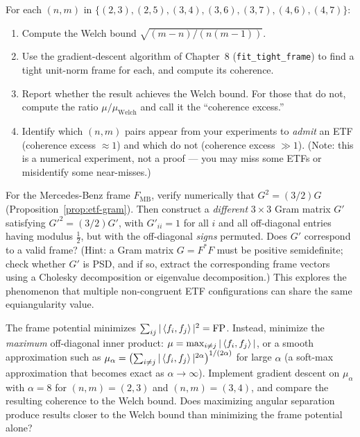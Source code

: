 \begin{exercisebox}[title={Lab Exercise 9.2: Welch Bound Survey}]
For each $(n,m)$ in $\{(2,3),(2,5),(3,4),(3,6),(3,7),(4,6),(4,7)\}$:
\begin{enumerate}[label=(\alph*)]
  \item Compute the Welch bound $\sqrt{(m-n)/(n(m-1))}$.
  \item Use the gradient-descent algorithm of Chapter~8
        (\texttt{fit\_tight\_frame}) to find a tight unit-norm frame for
        each, and compute its coherence.
  \item Report whether the result achieves the Welch bound. For those
        that do not, compute the ratio $\mu/\mu_{\mathrm{Welch}}$ and
        call it the ``coherence excess.''
  \item Identify which $(n,m)$ pairs appear from your experiments to
        \emph{admit} an ETF (coherence excess $\approx 1$) and which do
        not (coherence excess $\gg 1$). (Note: this is a numerical
        experiment, not a proof --- you may miss some ETFs or
        misidentify some near-misses.)
\end{enumerate}
\end{exercisebox}

\begin{exercisebox}[title={Lab Exercise 9.3: The Gram Matrix Condition}]
For the Mercedes-Benz frame $F_\mathrm{MB}$, verify numerically that
$G^2=(3/2)G$ (Proposition~\ref{prop:etf-gram}). Then construct a
\emph{different} $3\times3$ Gram matrix $G'$ satisfying $G'^2=(3/2)G'$,
with $G'_{ii}=1$ for all $i$ and all off-diagonal entries having modulus
$\tfrac12$, but with the off-diagonal \emph{signs} permuted. Does $G'$
correspond to a valid frame? (Hint: a Gram matrix $G=F^*F$ must be
positive semidefinite; check whether $G'$ is PSD, and if so, extract the
corresponding frame vectors using a Cholesky decomposition or eigenvalue
decomposition.) This explores the phenomenon that multiple non-congruent
ETF configurations can share the same equiangularity value.
\end{exercisebox}

\begin{exercisebox}[title={Lab Exercise 9.4: Coherence-Minimizing Descent}]
The frame potential minimizes $\sum_{ij}|\left\langle f_i, f_j \right\rangle|^2=\operatorname{FP}$.
Instead, minimize the \emph{maximum} off-diagonal inner product:
$\mu = \max_{i\ne j}|\left\langle f_i, f_j \right\rangle|$, or a smooth approximation
such as $\mu_\alpha = \bigl(\sum_{i\ne j}|\left\langle f_i, f_j \right\rangle|^{2\alpha}
\bigr)^{1/(2\alpha)}$ for large $\alpha$ (a soft-max approximation that
becomes exact as $\alpha\to\infty$). Implement gradient descent on
$\mu_\alpha$ with $\alpha=8$ for $(n,m)=(2,3)$ and $(n,m)=(3,4)$, and
compare the resulting coherence to the Welch bound. Does maximizing
angular separation produce results closer to the Welch bound than
minimizing the frame potential alone?
\end{exercisebox}

